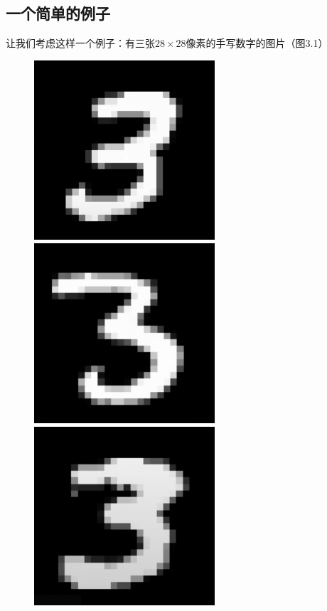 \documentclass[UTF8]{ctexbook}
\begin{document}
\subsection{一个简单的例子}
让我们考虑这样一个例子：有三张$28\times 28$像素的手写数字的图片（图3.1）
\begin{figure}[h]
    \centering
    \subfigure
    {
        \begin{minipage}[b]{.3\linewidth}
            \centering
            \includegraphics[width=0.6\textwidth]{3.1.png}
        \end{minipage}
    }
    \subfigure
    {
        \begin{minipage}[b]{.3\linewidth}
            \centering
            \includegraphics[width=0.6\textwidth]{3.2.png}
        \end{minipage}
    }
    \subfigure
    {
        \begin{minipage}[b]{.3\linewidth}
            \centering
            \includegraphics[width=0.6\textwidth]{3.3.png}

\end{minipage}}
\end{figure}
\end{document}
